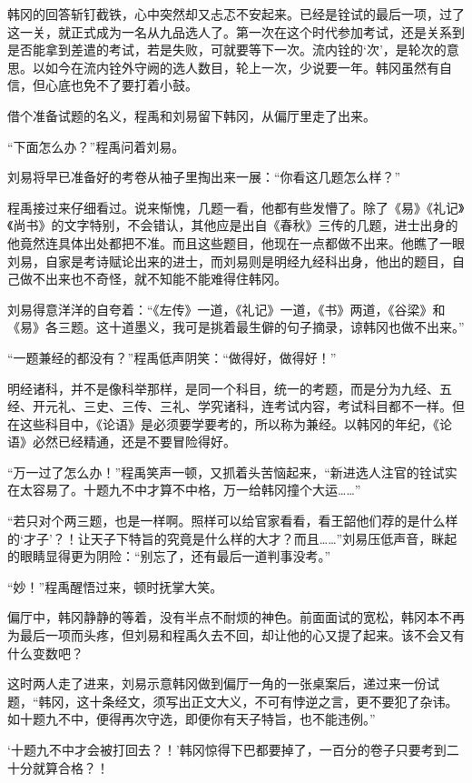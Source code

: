 韩冈的回答斩钉截铁，心中突然却又忐忑不安起来。已经是铨试的最后一项，过了这一关，就正式成为一名从九品选人了。第一次在这个时代参加考试，还是关系到是否能拿到差遣的考试，若是失败，可就要等下一次。流内铨的‘次’，是轮次的意思。以如今在流内铨外守阙的选人数目，轮上一次，少说要一年。韩冈虽然有自信，但心底也免不了要打着小鼓。

借个准备试题的名义，程禹和刘易留下韩冈，从偏厅里走了出来。

“下面怎么办？”程禹问着刘易。

刘易将早已准备好的考卷从袖子里掏出来一展：“你看这几题怎么样？”

程禹接过来仔细看过。说来惭愧，几题一看，他都有些发懵了。除了《易》《礼记》《尚书》的文字特别，不会错认，其他应是出自《春秋》三传的几题，进士出身的他竟然连具体出处都把不准。而且这些题目，他现在一点都做不出来。他瞧了一眼刘易，自家是考诗赋论出来的进士，而刘易则是明经九经科出身，他出的题目，自己做不出来也不奇怪，就不知能不能难得住韩冈。

刘易得意洋洋的自夸着：“《左传》一道，《礼记》一道，《书》两道，《谷梁》和《易》各三题。这十道墨义，我可是挑着最生僻的句子摘录，谅韩冈也做不出来。”

“一题兼经的都没有？”程禹低声阴笑：“做得好，做得好！”

明经诸科，并不是像科举那样，是同一个科目，统一的考题，而是分为九经、五经、开元礼、三史、三传、三礼、学究诸科，连考试内容，考试科目都不一样。但在这些科目中，《论语》是必须要学要考的，所以称为兼经。以韩冈的年纪，《论语》必然已经精通，还是不要冒险得好。

“万一过了怎么办！”程禹笑声一顿，又抓着头苦恼起来，“新进选人注官的铨试实在太容易了。十题九不中才算不中格，万一给韩冈撞个大运……”

“若只对个两三题，也是一样啊。照样可以给官家看看，看王韶他们荐的是什么样的‘才子’？！让天子下特旨的究竟是什么样的大才？而且……”刘易压低声音，眯起的眼睛显得更为阴险：“别忘了，还有最后一道判事没考。”

“妙！”程禹醒悟过来，顿时抚掌大笑。

偏厅中，韩冈静静的等着，没有半点不耐烦的神色。前面面试的宽松，韩冈本不再为最后一项而头疼，但刘易和程禹久去不回，却让他的心又提了起来。该不会又有什么变数吧？

这时两人走了进来，刘易示意韩冈做到偏厅一角的一张桌案后，递过来一份试题，“韩冈，这十条经文，须写出正文大义，不可有悖逆之言，更不要犯了杂讳。如十题九不中，便得再次守选，即便你有天子特旨，也不能违例。”

‘十题九不中才会被打回去？！’韩冈惊得下巴都要掉了，一百分的卷子只要考到二十分就算合格？！

